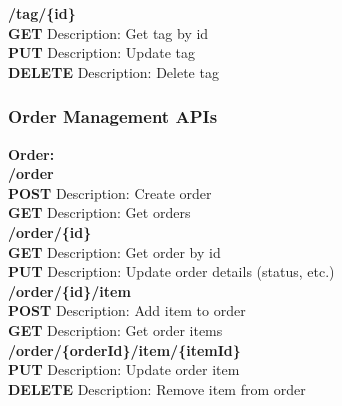 \documentclass[11pt,a4paper,pdftex]{article}
\begin{document}
\hspace*{1em}\textbf{/tag/\{\textbf{id}\}}\\
\hspace*{2em}\textbf{GET} Description: Get tag by id\\
\hspace*{2em}\textbf{PUT} Description: Update tag\\
\hspace*{2em}\textbf{DELETE} Description: Delete tag\\


\subsubsection{Order Management APIs}
\textbf{Order:}\\
\hspace*{1em}\textbf{/order}\\
\hspace*{2em}\textbf{POST} Description: Create order\\
\hspace*{2em}\textbf{GET} Description: Get orders\\

\hspace*{1em}\textbf{/order/\{\textbf{id}\}}\\
\hspace*{2em}\textbf{GET} Description: Get order by id\\
\hspace*{2em}\textbf{PUT} Description: Update order details (status, etc.)\\

\hspace*{1em}\textbf{/order/\{\textbf{id}\}/item}\\
\hspace*{2em}\textbf{POST} Description: Add item to order\\
\hspace*{2em}\textbf{GET} Description: Get order items\\

\hspace*{1em}\textbf{/order/\{\textbf{orderId}\}/item/\{\textbf{itemId}\}}\\
\hspace*{2em}\textbf{PUT} Description: Update order item\\
\hspace*{2em}\textbf{DELETE} Description: Remove item from order\\
\end{document}
